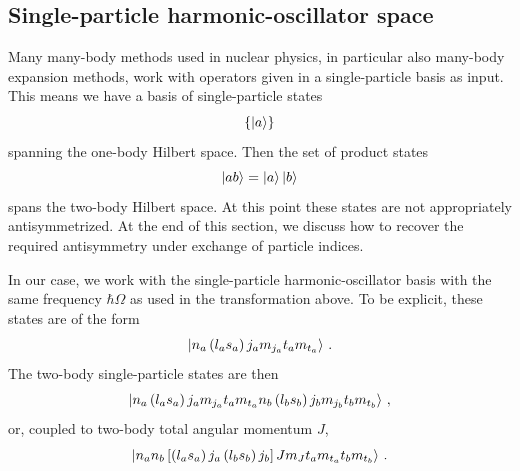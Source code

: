 \subsection{Single-particle harmonic-oscillator space}\label{sec:sp_ho}

Many many-body methods used in nuclear physics,
in particular also many-body expansion methods,
work with operators given in a single-particle basis as input.
This means we have a basis of single-particle states
\begin{equation}
  \left\{ \ket{a} \right\}
\end{equation}
spanning the one-body Hilbert space.
Then the set of product states
\begin{equation}
  \ket{a b} = \ket{a} \ket{b}
\end{equation}
spans the two-body Hilbert space.
At this point these states are not appropriately antisymmetrized.
At the end of this section,
we discuss how to recover the required antisymmetry under exchange of particle indices.

In our case, we work with the single-particle harmonic-oscillator basis with the same frequency $\hbar \Omega$
as used in the transformation above.
To be explicit, these states are of the form
\begin{equation}\label{eq:ho_sp_states}
  \ket{n_a \left(l_a s_a\right) j_a m_{j_{a}} t_a m_{t_a}}\,.
\end{equation}
The two-body single-particle states are then
\begin{equation}\label{eq:mscheme_twop_state}
  \ket{n_a \left(l_a s_a\right) j_a m_{j_{a}} t_a m_{t_a} n_b \left(l_b s_b\right) j_b m_{j_b} t_b m_{t_b}}\,,
\end{equation}
or, coupled to two-body total angular momentum $J$,
\begin{equation}\label{eq:jscheme_twop_state}
  \ket{n_a n_b \left[\left(l_a s_a\right) j_a \left(l_b s_b\right) j_b\right]J m_{J} t_a m_{t_a} t_b m_{t_b}}\,.
\end{equation}

